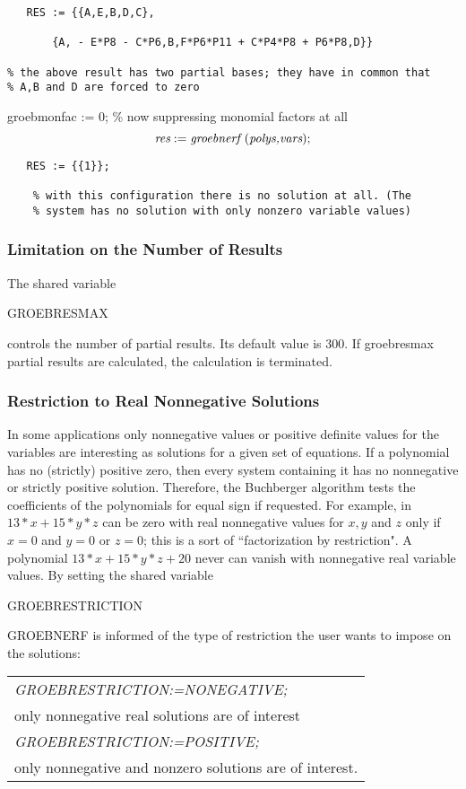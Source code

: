 \begin{verbatim}
   RES := {{A,E,B,D,C},

       {A, - E*P8 - C*P6,B,F*P6*P11 + C*P4*P8 + P6*P8,D}}

% the above result has two partial bases; they have in common that
% A,B and D are forced to zero
\end{verbatim}

groebmonfac := 0; \% now suppressing monomial factors at all
\[
\mbox{\it res} := \mbox{\it groebnerf }(\mbox{\it polys,vars});
\]
\begin{verbatim}
   RES := {{1}};

    % with this configuration there is no solution at all. (The
    % system has no solution with only nonzero variable values)
\end{verbatim}

\subsubsection{Limitation on the Number of Results}
The shared variable
\begin{center}
GROEBRESMAX
\end{center}
controls the number of partial results. Its default value is 300. If
groebresmax partial results are calculated, the calculation is
terminated.

\subsubsection{Restriction to Real Nonnegative Solutions}
In some applications only nonnegative values or positive definite
values for the variables are interesting as solutions for a given set
of equations. If a polynomial has no (strictly) positive zero, then
every system containing it has no nonnegative or strictly positive
solution. Therefore, the Buchberger algorithm tests the coefficients of
the polynomials for equal sign if requested. For example, in $13*x +
15*y*z $ can be zero with real nonnegative values for $x, y$ and $z$
only if $x=0$ and $y=0$ or $ z=0$; this is a sort of ``factorization by
restriction". A polynomial $13*x + 15*y*z + 20$ never can vanish
with nonnegative real variable values. By setting the shared variable
\begin{center} GROEBRESTRICTION \end{center}
GROEBNERF is informed of the type of restriction the user wants to
impose on the solutions:
\begin{center}
\begin{tabular}{l}
{\it GROEBRESTRICTION:=NONEGATIVE;} \\
\hspace*{+.5cm} only nonnegative real solutions are of
interest\vspace*{4mm} \\
{\it GROEBRESTRICTION:=POSITIVE;} \\
\hspace*{+.5cm}only nonnegative and nonzero solutions are of
interest.
\end{tabular}
\end{center}


